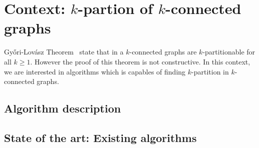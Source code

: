 \section{Context: $k$-partion of $k$-connected graphs}
Gy{\H o}ri-Lovász Theorem~\cite{GE78,LL77} state that in a $k$-connected graphs are 
$k$-partitionable for all $k \geq 1$. However the proof of this theorem
is not constructive. In this context, we are interested in algorithms which
is capables of finding $k$-partition in $k$-connected graphs.

\subsection{Algorithm description}


\subsection{State of the art: Existing algorithms}

